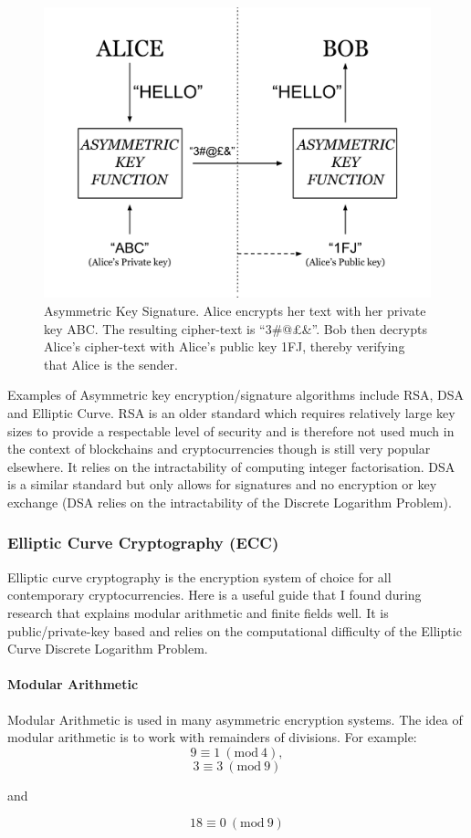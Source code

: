 \documentclass{article}
\begin{document}
\begin{figure}[h]
    \centering
    \includegraphics[width=0.6\linewidth]{Images/Diagrams/asymmetric_key_signature.png}
    \caption{Asymmetric Key Signature. Alice encrypts her text with her private key ABC. The resulting cipher-text is ``3\#@£\&''. Bob then decrypts Alice's cipher-text with Alice's public key 1FJ, thereby verifying that Alice is the sender.}
    \label{fig:asymkeysig}
\end{figure}

Examples of Asymmetric key encryption/signature algorithms include RSA, DSA and Elliptic Curve. RSA is an older standard which requires relatively large key sizes to provide a respectable level of security and is therefore not used much in the context of blockchains and cryptocurrencies though is still very popular elsewhere. It relies on the intractability of computing integer factorisation. DSA is a similar standard but only allows for signatures and no encryption or key exchange (DSA relies on the intractability of the Discrete Logarithm Problem).

\subsubsection{Elliptic Curve Cryptography (ECC)}
Elliptic curve cryptography is the encryption system of choice for all contemporary cryptocurrencies. Here\cite{ic_encryption_course} is a useful guide that I found during research that explains modular arithmetic and finite fields well. It is public/private-key based and relies on the computational difficulty of the Elliptic Curve Discrete Logarithm Problem.

\paragraph{Modular Arithmetic}
Modular Arithmetic is used in many asymmetric encryption systems. The idea of modular arithmetic is to work with remainders of divisions. For example: \[9 \equiv 1\ (\textrm{mod}\ 4),\]\[3 \equiv 3\ (\textrm{mod}\ 9)\]{\centering and \par}\[18 \equiv 0\ (\textrm{mod}\ 9)\]
\end{document}
